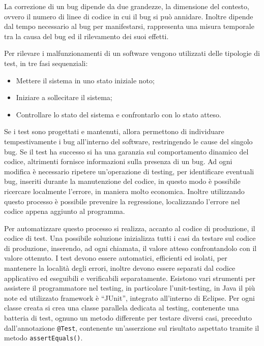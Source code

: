 \documentclass{article}
\numberwithin{equation}{subsection}
\begin{document}
La correzione di un bug dipende da due grandezze, la dimensione del contesto, ovvero il numero di linee di codice in cui il bug si può annidare. Inoltre dipende dal tempo 
necessario al bug per manifestarsi, rappresenta una misura temporale tra la causa del bug ed il rilevamento dei suoi effetti. 


Per rilevare i malfunzionamenti di un software vengono utilizzati delle tipologie di test, in tre fasi sequenziali:
\begin{itemize}
    \item Mettere il sistema in uno stato iniziale noto;
    \item Iniziare a sollecitare il sistema;
    \item Controllare lo stato del sistema e confrontarlo con lo stato atteso. 
\end{itemize}

Se i test sono progettati e mantenuti, allora permettono di individuare tempestivamente i bug all'interno del software, restringendo le cause del singolo bug. Se il test ha 
successo si ha una garanzia sul comportamento dinamico del codice, altrimenti fornisce informazioni sulla presenza di un bug. 
Ad ogni modifica è necessario ripetere un'operazione di testing, per identificare eventuali bug, inseriti durante la manutenzione del codice, in questo modo è possibile 
ricercare localmente l'errore, in maniera molto economica. Inoltre utilizzando questo processo è possibile prevenire la regressione, localizzando l'errore nel codice appena 
aggiunto al programma. 


Per automatizzare questo processo si realizza, accanto al codice di produzione, il codice di test. Una possibile soluzione inizializza tutti i casi da testare sul codice 
di produzione, inserendo, ad ogni chiamata, il valore atteso confrontandolo con il valore ottenuto. 
I test devono essere automatici, efficienti ed isolati, per mantenere la località degli errori, inoltre devono essere separati dal codice applicativo ed eseguibili e 
verificabili separatamente. 
Esistono vari strumenti per assistere il programmatore nel testing, in particolare l'unit-testing, in Java il più note ed utilizzato framework è ``JUnit'', integrato 
all'interno di Eclipse. 
Per ogni classe creata si crea una classe parallela dedicata al testing, contenente una batteria di test, ognuno un metodo differente per testare diversi casi, preceduto 
dall'annotazione \verb|@Test|, contenente un'asserzione sul risultato aspettato tramite il metodo \verb|assertEquals()|. 
\end{document}
